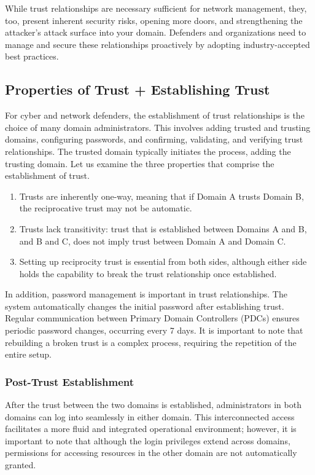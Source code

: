 While trust relationships are necessary sufficient for network management, they, too, present inherent security risks, opening more doors, and strengthening the attacker's attack surface into your domain. Defenders and organizations need to manage and secure these relationships proactively by adopting industry-accepted best practices.

\subsection{Properties of Trust + Establishing Trust}
For cyber and network defenders, the establishment of trust relationships is the choice of many domain administrators. This involves adding trusted and trusting domains, configuring passwords, and confirming, validating, and verifying trust relationships. The trusted domain typically initiates the process, adding the trusting domain. Let us examine the three properties that comprise the establishment of trust.
\begin{enumerate}
    \item Trusts are inherently one-way, meaning that if Domain A trusts Domain B, the reciprocative trust may not be automatic.
    \item Trusts lack transitivity: trust that is established between Domains A and B, and B and C, does not imply trust between Domain A and Domain C.
    \item Setting up reciprocity trust is essential from both sides, although either side holds the capability to break the trust relationship once established.
\end{enumerate}

In addition, password management is important in trust relationships. The system automatically changes the initial password after establishing trust. Regular communication between Primary Domain Controllers (PDCs) ensures periodic password changes, occurring every 7 days. It is important to note that rebuilding a broken trust is a complex process, requiring the repetition of the entire setup.

 
\subsubsection{Post-Trust Establishment}
After the trust between the two domains is established, administrators in both domains can log into seamlessly in either domain. This interconnected access facilitates a more fluid and integrated operational environment; however, it is important to note that although the login privileges extend across domains, permissions for accessing resources in the other domain are not automatically granted.


